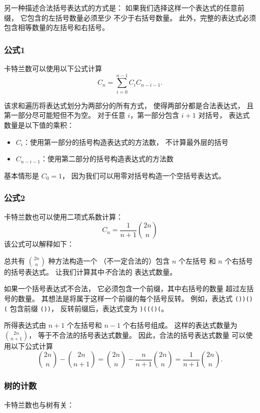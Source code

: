 另一种描述合法括号表达式的方式是：
如果我们选择这样一个表达式的任意前缀，
它包含的左括号数量必须至少
不少于右括号数量。
此外，完整的表达式必须
包含相等数量的左括号和右括号。

\subsubsection{公式1}

卡特兰数可以使用以下公式计算
\[ C_n = \sum_{i=0}^{n-1} C_{i} C_{n-i-1}.\]

该求和遍历将表达式划分为两部分的所有方式，
使得两部分都是合法表达式，
且第一部分尽可能短但不为空。
对于任意 $i$，第一部分包含 $i+1$ 对括号，
表达式数量是以下值的乘积：

\begin{itemize}
\item $C_{i}$：使用第一部分的括号构造表达式的方法数，
不计算最外层的括号
\item $C_{n-i-1}$：使用第二部分的括号构造表达式的方法数
\end{itemize}

基本情形是 $C_0=1$，
因为我们可以用零对括号构造一个空括号表达式。

\subsubsection{公式2}

卡特兰数也可以使用二项式系数计算：
\[ C_n = \frac{1}{n+1} {2n \choose n}\]
该公式可以解释如下：

总共有 ${2n \choose n}$ 种方法构造一个
（不一定合法的）包含 $n$ 个左括号
和 $n$ 个右括号的括号表达式。
让我们计算其中\emph{不}合法的
表达式数量。

如果一个括号表达式不合法，
它必须包含一个前缀，其中右括号的数量
超过左括号的数量。
其想法是将属于这样一个前缀的每个括号反转。
例如，表达式
\texttt{())()(} 包含前缀 \texttt{())}，
反转前缀后，表达式变为 \texttt{)((()(}。

所得表达式由 $n+1$ 个左括号和 $n-1$ 个右括号组成。
这样的表达式数量为 ${2n \choose n+1}$，
等于不合法的括号表达式数量。
因此，合法的括号表达式数量
可以使用以下公式计算
\[{2n \choose n}-{2n \choose n+1} = {2n \choose n} - \frac{n}{n+1} {2n \choose n} = \frac{1}{n+1} {2n \choose n}.\]

\subsubsection{树的计数}

卡特兰数也与树有关：

